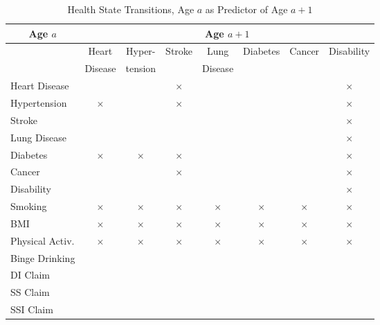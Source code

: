 \documentclass[static]{JJH-Beamer}
\begin{document}
\clearpage
\begin{frame}

\begin{table}[H]
\caption{Health State Transitions, Age $a$ as Predictor of Age $a+1$}\label{table:transition}
\begin{center}
\begin{tabular}{l|ccccccc} \toprule
\multicolumn{1}{c}{Age $a$} & \multicolumn{7}{c}{Age $a+1$} \\ \midrule
  & Heart & Hyper- & Stroke & Lung  & Diabetes & Cancer & Disability \\
&  Disease & tension &  & Disease & & & \\
Heart Disease & & & $\times$& & & &$\times$ \\
Hypertension  &  $\times$& & $\times$ & & & &$\times$ \\
Stroke           & & & & & & &$\times$ \\
Lung Disease & & & & & & &$\times$ \\
Diabetes       & $\times$ &$\times$  & $\times$   & & & &$\times$ \\
Cancer         & & & $\times$ &  & &   &$\times$ \\
Disability     & & & & & & &$\times$ \\
\midrule
Smoking & $\times$& $\times$ & $\times$ & $\times$& $\times$& $\times$&$\times$ \\
BMI & $\times$& $\times$&$\times$ & $\times$& $\times$& $\times$&$\times$ \\
Physical Activ. & $\times$& $\times$&$\times$ & $\times$& $\times$& $\times$&$\times$ \\
Binge Drinking & & & & & & &  \\
\midrule
DI Claim      & & & & &  & & \\
SS Claim     & & & & & & & \\
SSI Claim   & & & & & & & \\ \bottomrule
\end{tabular}
\end{center}
\end{table}

\end{frame}

\clearpage
\end{document}
